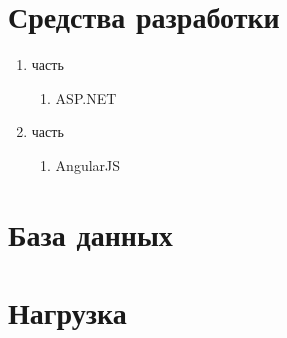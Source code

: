 \documentclass[14pt,a4paper]{extarticle}
\begin{document}
%		
%		
%		
%		
%		 
	
	
	\section {Средства разработки}
	\begin{enumerate}
		\item { часть}
		\begin{enumerate}
			\item ASP.NET
		\end{enumerate}
		
		\item { часть}
		\begin{enumerate}
			\item AngularJS
		\end{enumerate}
	\end{enumerate}
	
	\section {База данных}
	
	\section {}
	
	\section {Нагрузка}
	
\end{document}
